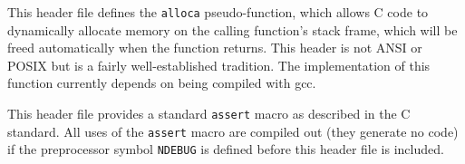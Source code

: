 \label{alloca-h}
\begin{apidesc}
	This header file defines the \texttt{alloca} pseudo-function,
	which allows C code to dynamically allocate memory
	on the calling function's stack frame,
	which will be freed automatically when the function returns.
	This header is not ANSI or POSIX
	but is a fairly well-established tradition.
	The implementation of this function currently depends on being
	compiled with gcc.
\end{apidesc}

\label{assert-h}
\begin{apidesc}
	This header file provides a standard {\tt assert} macro
	as described in the C standard.
	All uses of the {\tt assert} macro are compiled out
	(they generate no code)
	if the preprocessor symbol {\tt NDEBUG} is defined
	before this header file is included.
\end{apidesc}

